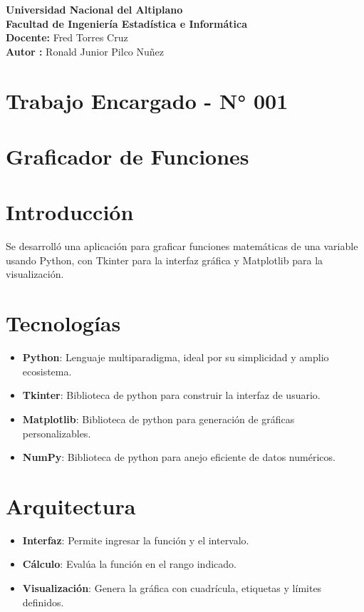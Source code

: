 \documentclass[12pt]{article}
\begin{document}
\noindent \textbf{\large Universidad Nacional del Altiplano\\
Facultad de Ingeniería Estadística e Informática\\
Docente: } \large Fred Torres Cruz\\
\textbf {\large Autor :} Ronald Junior Pilco Nuñez
\begin{center}
 \section*{Trabajo Encargado - N° 001}
 \section*{Graficador de Funciones}
\end{center}

\section{Introducción}

\noindent Se desarrolló una aplicación para graficar funciones matemáticas de una variable usando Python, con Tkinter para la interfaz gráfica y Matplotlib para la visualización.

\section{Tecnologías}

\begin{itemize}
    \item \textbf{Python}: Lenguaje multiparadigma, ideal por su simplicidad y amplio ecosistema.
    \item \textbf{Tkinter}: Biblioteca de python para construir la interfaz de usuario.
    \item \textbf{Matplotlib}: Biblioteca de python para generación de gráficas personalizables.
    \item \textbf{NumPy}: Biblioteca de python para anejo eficiente de datos numéricos.
\end{itemize}

\section{Arquitectura}

\begin{itemize}
    \item \textbf{Interfaz}: Permite ingresar la función y el intervalo.
    \item \textbf{Cálculo}: Evalúa la función en el rango indicado.
    \item \textbf{Visualización}: Genera la gráfica con cuadrícula, etiquetas y límites definidos.
\end{itemize}
\end{document}
